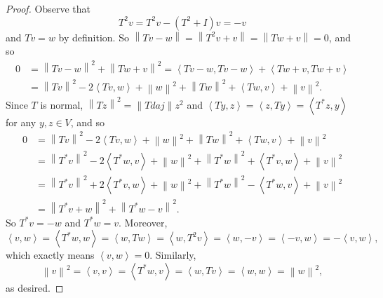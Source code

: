 \documentclass[linearalgebraII]{subfiles}
\begin{document}
    \begin{proof}
        Observe that
        \begin{equation*}
            T^{2} v = T^{2} v - \left( T^{2} +I \right) v = -v
        \end{equation*}
        and $Tv = w$ by definition. So $\left\lVert Tv-w\right\rVert  = \left\lVert T^{2} v+v\right\rVert = \left\lVert Tw+v\right\rVert = 0$, and so
        \begin{align*}
            0 & = \left\lVert Tv-w\right\rVert ^{2} + \left\lVert Tw+v\right\rVert ^{2} = \left\langle Tv-w, Tv-w\right\rangle + \left\langle Tw+v, Tw+v\right\rangle \\
              & = \left\lVert Tv\right\rVert ^{2} - 2\left\langle Tv, w\right\rangle + \left\lVert w\right\rVert ^{2} + \left\lVert Tw\right\rVert ^{2} + \left\langle Tw,v \right\rangle + \left\lVert v\right\rVert ^{2} .
        \end{align*} 
        Since $T$ is normal, $\left\lVert Tz\right\rVert ^{2} = \left\lVert Tdaj\right\rVert z  ^{2}$ and $\left\langle Ty, z\right\rangle = \left\langle z, Ty\right\rangle = \left\langle T^{*} z, y\right\rangle$ for any $y,z\in V$, and so
        \begin{align*}
              0 & = \left\lVert Tv\right\rVert ^{2} - 2\left\langle Tv, w\right\rangle + \left\lVert w\right\rVert ^{2} + \left\lVert Tw\right\rVert ^{2} + \left\langle Tw,v \right\rangle + \left\lVert v\right\rVert ^{2} \\
                & = \left\lVert T^{*} v\right\rVert ^{2} - 2\left\langle T^{*} w, v\right\rangle + \left\lVert w\right\rVert ^{2} + \left\lVert T^{*} w\right\rVert ^{2} + \left\langle T^{*} v,w \right\rangle + \left\lVert v\right\rVert ^{2} \\
                & = \left\lVert T^{*} v\right\rVert ^{2} + 2\left\langle T^{*} v, w\right\rangle + \left\lVert w\right\rVert ^{2} + \left\lVert T^{*} w\right\rVert ^{2} - \left\langle T^{*} w,v \right\rangle + \left\lVert v\right\rVert ^{2} \\
                & = \left\lVert T^{*} v+w\right\rVert ^{2} + \left\lVert T^{*} w-v\right\rVert ^{2} .
        \end{align*} 
        So $T^{*} v = -w$ and $T^{*} w = v$. Moreover,
        \begin{equation*}
            \left\langle v, w\right\rangle = \left\langle T^{*} w, w\right\rangle = \left\langle w, Tw\right\rangle = \left\langle w, T^{2} v\right\rangle = \left\langle w, -v\right\rangle = \left\langle -v, w\right\rangle = -\left\langle v, w\right\rangle ,
        \end{equation*}
        which exactly means $\left\langle v, w\right\rangle = 0$. Similarly,
        \begin{equation*}
            \left\lVert v\right\rVert ^{2} = \left\langle v, v\right\rangle= \left\langle T^{*} w, v\right\rangle = \left\langle w, Tv\right\rangle = \left\langle w, w\right\rangle = \left\lVert w\right\rVert ^{2} , 
        \end{equation*}
        as desired.
    \end{proof}
\end{document}
